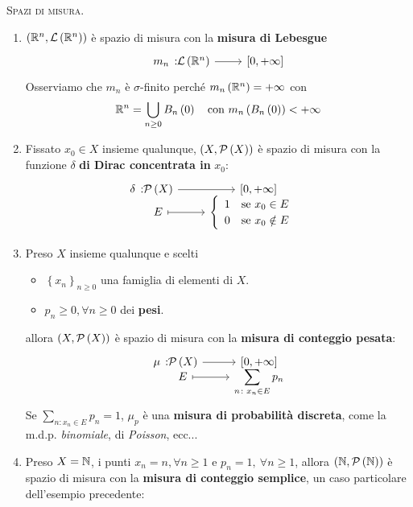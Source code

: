 \begin{examples}\textsc{Spazi di misura.}
	\begin{enumerate}
		\item $\left(\mathbb{R}^n,\mathcal{L}\left(\mathbb{R}^n\right)\right)$ è spazio di misura con la \textbf{misura di Lebesgue}
		\begin{equation}
			\funz{m_n}{\mathcal{L}\left(\realset^n\right)}{\left[0,+\infty\right]}
		\end{equation}
		Osserviamo che $m_n$ è $\sigma$-finito perché $m_n\left(\mathbb{R}^n\right)=+\infty$ con
		\begin{equation*}
			\mathbb{R}^n=\bigcup_{n\geq 0}B_n\left(0\right)\quad\text{con }m_n\left(B_n\left(0\right)\right)<+\infty
		\end{equation*}
		\item Fissato $x_0\in X$ insieme qualunque, $\left(X,\mathcal{P}\left(X\right)\right)$ è spazio di misura con la funzione $\delta$ \textbf{di Dirac concentrata in} $x_0$:
		\begin{equation}
			\funztot{\delta}{\setpart{X}}{\left[0,+\infty\right]}{E}{\begin{cases}
					\begin{array}{ll}
						1&\text{se }x_0\in E\\
						0&\text{se }x_0\notin E
					\end{array}
			\end{cases}}
		\end{equation}
		\item Preso $X$ insieme qualunque e scelti
		\begin{itemize}
			\item $\left\{x_n\right\}_{n\geq 0}$ una famiglia di elementi di $X$.
			\item $p_n\geq 0, \forall n\geq 0$ dei \textbf{pesi}.
		\end{itemize}
	allora $\left(X,\mathcal{P}\left(X\right)\right)$ è spazio di misura con la \textbf{misura di conteggio pesata}:
	\begin{equation}
		\funztot{\mu}{\setpart{X}}{\left[0,+\infty\right]}{E}{\displaystyle\sum_{n\colon x_n\in E}p_n}
	\end{equation}
Se $\displaystyle\sum_{n\colon x_n\in E}p_n=1$, $\mu_p$ è una \textbf{misura di probabilità discreta}, come la m.d.p. \textit{binomiale}, di \textit{Poisson}, ecc...\\
\item Preso $X=\mathbb{N}$, i punti $x_n=n, \forall n\geq 1$ e $p_n=1,\ \forall n\geq 1$, allora $\left(\mathbb{N},\mathcal{P}\left(\mathbb{N}\right)\right)$ è spazio di misura con la \textbf{misura di conteggio semplice}, un caso particolare dell'esempio precedente:

\end{enumerate}
\end{examples}
